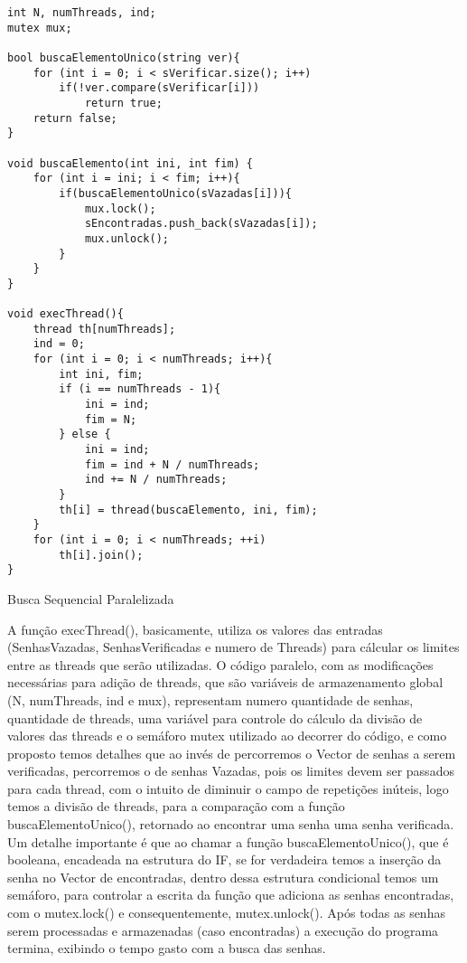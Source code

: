 \documentclass[10pt,journal,compsoc]{IEEEtran}
\begin{document}
\begin{listing}[ht]
\begin{verbatim}
int N, numThreads, ind;
mutex mux;

bool buscaElementoUnico(string ver){
    for (int i = 0; i < sVerificar.size(); i++)
        if(!ver.compare(sVerificar[i]))
            return true;
    return false;
}

void buscaElemento(int ini, int fim) {
    for (int i = ini; i < fim; i++){
        if(buscaElementoUnico(sVazadas[i])){
            mux.lock();
            sEncontradas.push_back(sVazadas[i]);
            mux.unlock();
        }
    }
}

void execThread(){
    thread th[numThreads];
    ind = 0;
    for (int i = 0; i < numThreads; i++){
        int ini, fim;
        if (i == numThreads - 1){
            ini = ind;
            fim = N;
        } else {
            ini = ind;
            fim = ind + N / numThreads;
            ind += N / numThreads;
        }
        th[i] = thread(buscaElemento, ini, fim);
    }	
    for (int i = 0; i < numThreads; ++i)
        th[i].join();
}
\end{verbatim}
\caption{Busca Sequencial Paralelizada}
\label{listing:3}
\end{listing}

	A função execThread(), basicamente, utiliza os valores das entradas (SenhasVazadas, SenhasVerificadas e numero de Threads) para cálcular os limites entre as threads que serão utilizadas. O código paralelo, com as modificações necessárias para adição de threads, que são variáveis de armazenamento global (N, numThreads, ind e mux), representam numero quantidade de senhas, quantidade de threads, uma variável para controle do cálculo da divisão de valores das threads e o semáforo mutex utilizado ao decorrer do código, e como proposto temos detalhes que ao invés de percorremos o Vector de senhas a serem verificadas, percorremos o de senhas Vazadas, pois os limites devem ser passados para cada thread, com o intuito de diminuir o campo de repetições inúteis, logo temos a divisão de threads, para a comparação com a função buscaElementoUnico(), retornado ao encontrar uma senha uma senha verificada. Um detalhe importante é que ao chamar a função buscaElementoUnico(), que é booleana, encadeada na estrutura do IF, se for verdadeira temos a inserção da senha no Vector de encontradas, dentro dessa estrutura condicional temos um semáforo, para controlar a escrita da função que adiciona as senhas encontradas, com o mutex.lock() e consequentemente, mutex.unlock(). Após todas as senhas serem processadas e armazenadas (caso encontradas) a execução do programa termina, exibindo o tempo gasto com a busca das senhas.
\end{document}
